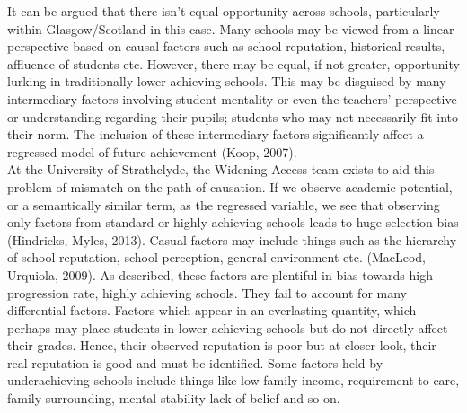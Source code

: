 \documentclass[11pt, english]{article}
\begin{document}
	It can be argued that there isn't equal opportunity across schools, particularly within Glasgow/Scotland in this case. Many schools may be viewed from a linear perspective based on causal factors such as school reputation, historical results, affluence of students etc. However, there may be equal, if not greater, opportunity lurking in traditionally lower achieving schools. This may be disguised by many intermediary factors involving student mentality or even the teachers' perspective or understanding regarding  their pupils; students who may not necessarily fit into their norm. The inclusion of these intermediary factors significantly affect a regressed model of future achievement (Koop, 2007).\\

	At the University of Strathclyde, the Widening Access team exists to aid this problem of mismatch on the path of causation. If we observe academic potential, or a semantically similar term, as the regressed variable, we see that observing only factors from standard or highly achieving schools leads to huge selection bias (Hindricks, Myles, 2013). Casual factors may include things such as the hierarchy of school reputation, school perception, general environment etc. (MacLeod, Urquiola, 2009). As described, these factors are plentiful in bias towards high progression rate, highly achieving schools. They fail to account for many differential factors. Factors which appear in an everlasting quantity, which perhaps may place students in lower achieving schools but do not directly affect their grades. Hence, their observed reputation is poor but at closer look, their real reputation is good and must be identified. Some factors held by underachieving schools include things like low family income, requirement to care, family surrounding, mental stability lack of belief and so on.\\
\end{document}

